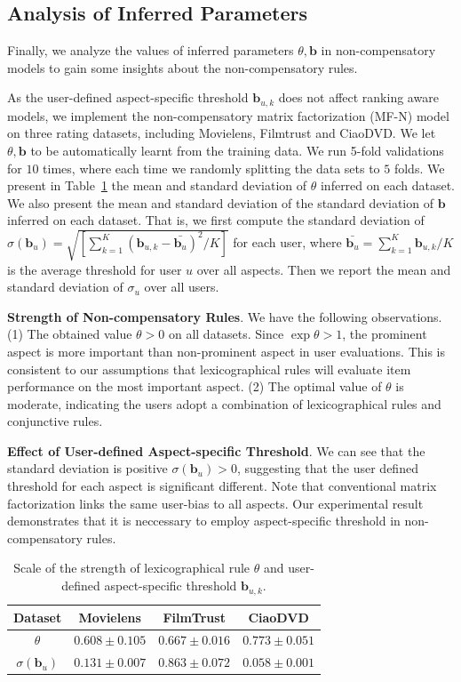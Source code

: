 \documentclass[letterpaper]{article} %
\begin{document}
\subsection{Analysis of Inferred Parameters}

Finally, we analyze the values of inferred parameters $\theta,\mathbf{b}$ in non-compensatory models to gain some insights about the non-compensatory rules. 

As the user-defined aspect-specific threshold $\mathbf{b}_{u,k}$ does not affect ranking aware models, we implement the non-compensatory matrix factorization (MF-N) model on three rating datasets, including Movielens, Filmtrust and CiaoDVD. We let $\theta,\mathbf{b}$ to be automatically learnt from the training data. We run 5-fold validations for $10$ times, where each time we randomly splitting the data sets to $5$ folds. We present in Table~\ref{tab:parameters} the mean and standard deviation of $\theta$ inferred on each dataset. We also present the mean and standard deviation of the standard deviation of $\mathbf{b}$ inferred on each dataset. That is, we first compute the standard deviation of $\sigma(\mathbf{b}_u)=\sqrt {[\sum_{k=1}^{K} (\mathbf{b}_{u,k}-\bar{\mathbf{b}_u})^2 /K]} $ for each user, where $\bar{\mathbf{b}_u}=\sum_{k=1}^K \mathbf{b}_{u,k} /K$ is the average threshold for user $u$ over all aspects. Then we report the mean and standard deviation of $\sigma_u$ over all users. 


\textbf{Strength of Non-compensatory Rules}. We have the following observations. (1) The obtained value $\theta>0$ on all datasets. Since $\exp\theta>1$, the prominent aspect is more important than non-prominent aspect in user evaluations. This is consistent to our assumptions that lexicographical rules will evaluate item performance on the most important aspect. (2)  The optimal value of $\theta$ is  moderate, indicating the users adopt a combination of lexicographical rules and conjunctive rules.  

\textbf{Effect of User-defined Aspect-specific Threshold}. We can see that the standard deviation is positive $\sigma(\mathbf{b}_{u})>0$, suggesting that the user defined threshold for each aspect is significant different. Note that conventional matrix factorization links the same user-bias to all aspects. Our experimental result demonstrates that it is neccessary to employ aspect-specific threshold in non-compensatory rules. 
\begin{table}[htp]
\tiny
\caption{Scale of the strength of lexicographical rule $\theta$ and user-defined aspect-specific threshold $\mathbf{b}_{u,k}$.}
\begin{center}
\begin{tabular}{|c|c|c|c|}
\hline
Dataset & Movielens & FilmTrust & CiaoDVD \\\hline
$\theta$ & $0.608\pm 0.105$ & $0.667\pm 0.016$ &	$0.773\pm 0.051$\\\hline
$\sigma(\mathbf{b}_{u})$ & $0.131\pm 0.007$ &	$0.863\pm 0.072$	& $0.058\pm 0.001$  \\\hline
\end{tabular}
\vspace*{-10pt}
\end{center}
\label{tab:parameters}
\end{table}%
\end{document}
